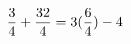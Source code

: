 \documentclass[preview]{standalone}
\begin{document}
\begin{align*}
\special{dvisvgm:raw <g id='unique000'>}\frac{3}{4} + \frac{32}{4} = 3(\frac{6}{4}) - 4\special{dvisvgm:raw </g>}
\end{align*}
\end{document}

